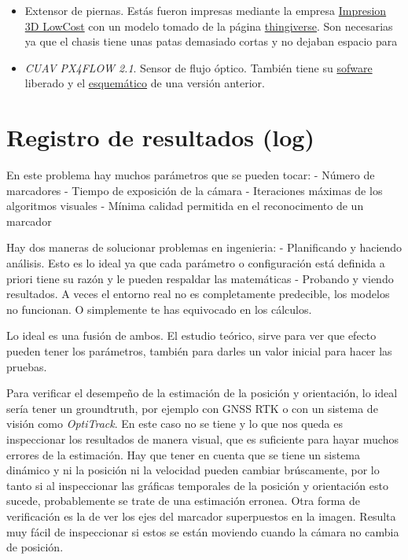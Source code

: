 \begin{itemize}
\item Extensor de piernas. Estás fueron impresas mediante la empresa \href{https://impresion3dlowcost.es/}{Impresion 3D LowCost} con un modelo tomado de la página \href{https://www.thingiverse.com/thing:915639}{thingiverse}. Son necesarias ya que el chasis tiene unas patas demasiado cortas y no dejaban espacio para  
\item \textit{CUAV PX4FLOW 2.1}. Sensor de flujo óptico. También tiene su \href{https://github.com/PX4/PX4-Flow}{sofware} liberado y el \href{https://github.com/pixhawk/Hardware/tree/master/FLOWv1}{esquemático} de una versión anterior.
\end{itemize}



\section{Registro de resultados (log)} 

En este problema hay muchos parámetros que se pueden tocar:
- Número de marcadores
- Tiempo de exposición de la cámara
- Iteraciones máximas de los algoritmos visuales
- Mínima calidad permitida en el reconocimento de un marcador 

Hay dos maneras de solucionar problemas en ingenieria:
- Planificando y haciendo análisis. Esto es lo ideal ya que cada parámetro o configuración está definida a priori tiene su razón y le pueden respaldar las matemáticas
- Probando y viendo resultados. A veces el entorno real no es completamente predecible, los modelos no funcionan. O simplemente te has equivocado en los cálculos.

Lo ideal es una fusión de ambos. El estudio teórico, sirve para ver que efecto pueden tener los parámetros, también para darles un valor inicial para hacer las pruebas.  

Para verificar el desempeño de la estimación de la posición y orientación, lo ideal sería tener un groundtruth, por ejemplo con GNSS RTK o con un sistema de visión como \textit{OptiTrack}. En este caso no se tiene y lo que nos queda es inspeccionar los resultados de manera visual, que es suficiente para hayar muchos errores de la estimación. Hay que tener en cuenta que se tiene un sistema dinámico y ni la posición ni la velocidad pueden cambiar brúscamente, por lo tanto si al inspeccionar las gráficas temporales de la posición y orientación esto sucede, probablemente se trate de una estimación erronea. Otra forma de verificación es la de ver los ejes del marcador superpuestos en la imagen. Resulta muy fácil de inspeccionar si estos se están moviendo cuando la cámara no cambia de posición.    

